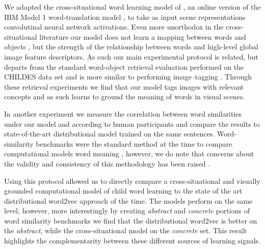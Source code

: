 We adapted the cross-situational word learning model of \cite{fazly.etal.10}, an 
online version of the IBM Model 1 word-translation model \citep{BrownPPM94}, to take as input scene
representations convolutinal neural network activations.
Even more unorthodox in the cross-situational literature our model does not learn a mapping between 
words and objects 
\citep{fazly.etal.10,lazaridou2016multimodal}, but the strength of the relationship between words and high-level
global image feature descriptors. As such our main experimental protocol is related, but departs from
the standard word-object retrieval evaluation performed on the CHILDES data set \citep{goodman2008bayesian,kievit2013naturalistic,lazaridou2016multimodal} and is more similar
to performing image--tagging \citep{weston2010large}. Through these retrieval experiments we find that
our model tags images with relevant concepts and as such learns to ground the meaning of words in visual
scenes.

In another experiment we measure the
correlation between word similarities under our model and according to human participants and compare
the results to state-of-the-art distributional model trained on the same sentences.
Word-similarity benchmarks were the standard method at the time to compare
computational models word meaning \citep{faruqui2014community}, however,
we do note that concerns about the validity and consistency of this methodology has been 
raised \citep{faruqui2016problems}.

Using this protocol allowed us to directly compare a cross-situational and visually grounded computational
model of child word learning to the state of the art distributional word2vec approach of the time. 
The models perform on the same level, however, more interestingly by creating
\emph{abstract} and  \emph{concrete} portions of word similarity benchmarks we find that
the distributional word2vec is better on the \emph{abstract}, while the cross-situational model on the 
\emph{concrete} set. This result highlights the complementarity
between these different sources of learning signals.


